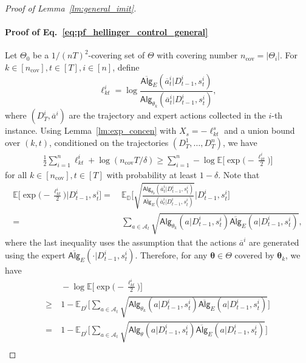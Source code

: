\documentclass[10pt]{article}
\newcommand{\<}{\left\langle}
\renewcommand{\>}{\right\rangle}
\newcommand{\E}{\mathbb{E}}
\newcommand{\Covnum}{{n_{\mathrm{cov}}}}
\newcommand{\widebar}[1]{\overline{#1}}
\newcommand{\state}{{s}}
\newcommand{\action}{{a}}
\newcommand{\eaction}{{\widebar{a}}}
\newcommand{\totlen}{{T}}
\newcommand{\ith}{{i}}
\newcommand{\sAlg}{{\mathsf{Alg}}}
\newcommand{\osAlg}{\overline{\mathsf{Alg}}}
\newcommand{\dset}{{D}}
\newcommand{\Numobs}{{n}}
\newcommand{\Par}{{\theta}}
\newcommand{\Parspace}{{\Theta}}
\newcommand{\actionsp}{{\mathcal{A}}}
\newcommand{\shortexp}{{E}}
\def\sD{{\mathbb{D}}}
\def\btheta{{\boldsymbol \theta}}
\begin{document}
\begin{proof}[Proof of Lemma~\ref{lm:general_imit}]
\paragraph{Proof of Eq.~\eqref{eq:pf_hellinger_control_general}}
Let $\Parspace_{0}$ be a $1/(\Numobs\totlen)^2$-covering set of $\Parspace$ with covering number $\Covnum=|\Parspace_{i}|$.
For $k\in[\Covnum],t\in[T],i\in[\Numobs]$, define  $$
\ell^i_{kt}
=\log
\frac{\osAlg_{\shortexp}(\eaction^\ith_t|\dset_{t-1}^\ith,\state^\ith_t)}{\sAlg_{\Par_k}(\eaction^\ith_t|\dset_{t-1}^\ith,\state^\ith_t)}
,$$
where $(\dset_\totlen^\ith,\eaction^\ith)$ are the trajectory and expert actions collected in the $i$-th instance. Using Lemma~\ref{lm:exp_concen} with $X_s=-\ell^s_{kt}$ and a union bound over $(k,t)$, conditioned on the trajectories $(\dset^1_\totlen,\ldots,\dset^{n}_\totlen)$, we have
\begin{align*}
    \frac{1}{2}\sum_{i=1}^\Numobs \ell_{kt}^i+\log(\Covnum \totlen/\delta)\geq
    \sum_{i=1}^n-\log\E\Big[\exp\Big(-\frac{\ell_{kt}^{i}}{2}\Big)\Big]
\end{align*}
for all $k\in[\Covnum],t\in[\totlen]$
with probability at least $1-\delta$. Note that
\begin{align*}
   \E\Big[\exp\Big(-\frac{\ell_{kt}^{i}}{2}\Big)\Big|\dset_{t-1}^\ith,\state_t^\ith\Big]
   =&~
\E_{\sD}\Bigg[\sqrt{\frac{\sAlg_{\Par_k}(\eaction^\ith_t|\dset_{t-1}^\ith,\state^\ith_t)}{\osAlg_{\shortexp}(\eaction^\ith_t|\dset_{t-1}^\ith,\state^\ith_t)}}\Bigg|\dset_{t-1}^\ith,\state_t^\ith\Bigg]\\
=&~
\sum_{\action\in\actionsp_t}\sqrt{\sAlg_{\Par_k}(\action|\dset_{t-1}^\ith,\state^\ith_t) \osAlg_{\shortexp}(\action|\dset_{t-1}^\ith,\state^\ith_t)},
\end{align*}
where the last inequality uses the assumption that the actions $\eaction^\ith$ are generated using the expert $\osAlg_{\shortexp}(\cdot|\dset_{t-1}^\ith,\state^\ith_t)$. Therefore, for any $\btheta\in\Theta$ covered by $\btheta_k$, we have
\begin{align*}
&~
    -\log\E\Big[\exp\Big(-\frac{\ell_{kt}^{i}}{2}\Big)\Big]\\
    \geq&~ 1-
 \E_{\dset^\ith}\Big[\sum_{\action\in\actionsp_t}\sqrt{\sAlg_{\Par_k}(\action|\dset_{t-1}^\ith,\state^\ith_t) \osAlg_{\shortexp}(\action|\dset_{t-1}^\ith,\state^\ith_t)}\Big]
    \\
    =&~
    1-
\E_{\dset^\ith}\Big[\sum_{\action\in\actionsp_t}\sqrt{\sAlg_{\Par}(\action|\dset_{t-1}^\ith,\state^\ith_t) \osAlg_{\shortexp}(\action|\dset_{t-1}^\ith,\state^\ith_t)}\Big]\\

\end{align*}
\end{proof}
\end{document}
